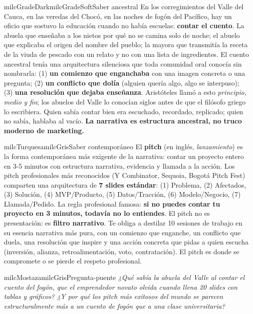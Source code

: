 \documentclass[11pt,letterpaper]{article}
\begin{document}
\begin{softbox}{milcGradeDark}{milcGradeSoft}{Saber ancestral}
En los corregimientos del Valle del Cauca, en las veredas del Chocó, en las noches de fogón del Pacífico, hay un oficio que sostuvo la educación cuando no había escuelas: \textbf{contar el cuento}. La abuela que enseñaba a los nietos por qué no se camina solo de noche; el abuelo que explicaba el origen del nombre del pueblo; la mayora que transmitía la receta de la viuda de pescado con un relato y no con una lista de ingredientes. El cuento ancestral tenía una arquitectura silenciosa que toda comunidad oral conocía sin nombrarla: (1) \textbf{un comienzo que enganchaba} con una imagen concreta o una pregunta; (2) \textbf{un conflicto que dolía} (alguien quería algo, algo se interpuso); (3) \textbf{una resolución que dejaba enseñanza}. Aristóteles llamó a esto \emph{principio, medio y fin}; los abuelos del Valle lo conocían siglos antes de que el filósofo griego lo escribiera. Quien sabía contar bien era escuchado, recordado, replicado; quien no sabía, hablaba al vacío. \textbf{La narrativa es estructura ancestral, no truco moderno de marketing.}
\end{softbox}

\begin{softbox}{milcTurquesa}{milcGris}{Saber contemporáneo}
El \textbf{pitch} (en inglés, \emph{lanzamiento}) es la forma contemporánea más exigente de la narrativa: contar un proyecto entero en 3-5 minutos con estructura narrativa, evidencia y llamada a la acción. Los pitch profesionales más reconocidos (Y Combinator, Sequoia, Bogotá Pitch Fest) comparten una arquitectura de \textbf{7 slides estándar}: (1) Problema, (2) Afectados, (3) Solución, (4) MVP/Producto, (5) Datos/Tracción, (6) Modelo/Negocio, (7) Llamada/Pedido. La regla profesional famosa: \textbf{si no puedes contar tu proyecto en 3 minutos, todavía no lo entiendes}. El pitch no es presentación: es \textbf{filtro narrativo}. Te obliga a destilar 10 sesiones de trabajo en su esencia narrativa más pura, con un comienzo que enganche, un conflicto que duela, una resolución que inspire y una acción concreta que pidas a quien escucha (inversión, alianza, retroalimentación, voto, contratación). El pitch es donde se compromete o se pierde el respeto profesional.
\end{softbox}

\begin{softbox}{milcMostaza}{milcGris}{Pregunta-puente}
\textit{¿Qué sabía la abuela del Valle al contar el cuento del fogón, que el emprendedor novato olvida cuando llena 20 slides con tablas y gráficos? ¿Y por qué los pitch más exitosos del mundo se parecen estructuralmente más a un cuento de fogón que a una clase universitaria?}
\end{softbox}
\end{document}
